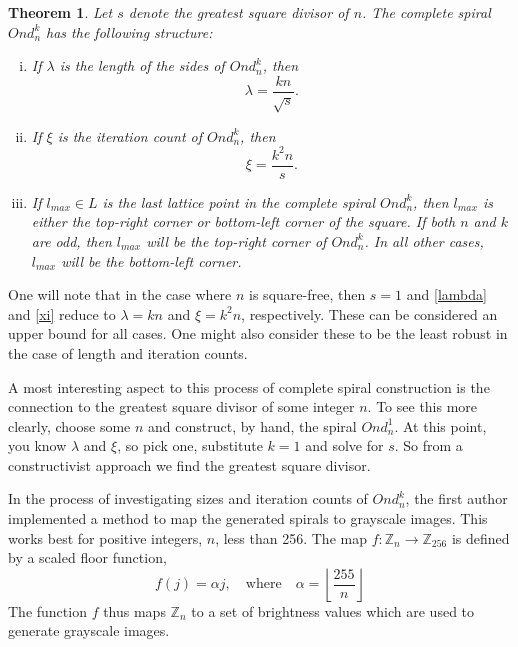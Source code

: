 \documentclass[11pt,reqno]{amsart}
\theoremstyle{mydef}
\newtheorem{thm}{Theorem}[section]
\def\ZZ{\mathbb{Z}}
\begin{document}
\begin{thm}%
\label{lenthm}
Let $s$ denote the greatest square divisor of $n$.
The complete spiral $Ond^k_n$ has the following structure:
\begin{enumerate}[(i)]
\item If $\lambda$ is the length of the sides of $Ond^k_n$, then
\begin{equation}
  \lambda = \frac{kn}{\sqrt{s}}.
\label{lambda}
\end{equation}
\item If $\xi$ is the iteration count of $Ond^k_n$, then
\begin{equation}
  \xi = \frac{k^2n}{s}.  
\label{xi}
\end{equation}
\item If $l_{max} \in L$ is the last lattice point in the complete
  spiral $Ond^k_n$, then $l_{max}$ is either the top-right corner or
  bottom-left corner of the square.  If both $n$ and $k$ are odd, then
  $l_{max}$ will be the top-right corner of $Ond^k_n$.  In all other
  cases, $l_{max}$ will be the bottom-left corner.
\end{enumerate}
\end{thm}

One will note that in the case where $n$ is square-free, then $s=1$
and \eqref{lambda} and \eqref{xi} reduce to $\lambda = k n$ and $\xi =
k^2 n$, respectively. These can be considered an upper bound for all
cases.  One might also consider these to be the least robust in the
case of length and iteration counts.

A most interesting aspect to this process of complete spiral
construction is the connection to the greatest square divisor of some
integer $n$.  To see this more clearly, choose some $n$ and construct,
by hand, the spiral $Ond^1_n$.  At this point, you know $\lambda$ and
$\xi$, so pick one, substitute $k = 1$ and solve for $s$.  So from a
constructivist approach we find the greatest square divisor.


In the process of investigating sizes and iteration counts of
$Ond^k_n$, the first author implemented a method to map the generated
spirals to grayscale images. This works best for positive integers,
$n$, less than 256.  The map $f : \ZZ_n \to \ZZ_{256}$ is defined by a
scaled floor function,
\[
   f(j) = \alpha j, \quad \text{where} \quad
   \alpha = \left\lfloor \frac{255}n \right\rfloor
\]
The function $f$ thus maps $\ZZ_n$ to a set of brightness values which
are used to generate grayscale images.
\end{document}
